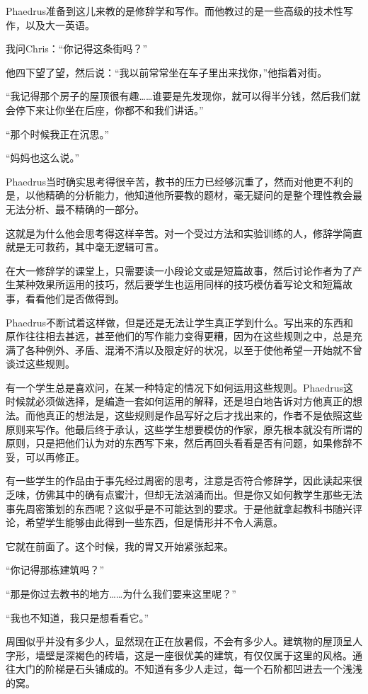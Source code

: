 \documentclass[UTF8]{article}
\begin{document}
\par Phaedrus准备到这儿来教的是修辞学和写作。而他教过的是一些高级的技术性写作，以及大一英语。
\par 我问Chris：“你记得这条街吗？”
\par 他四下望了望，然后说：“我以前常常坐在车子里出来找你，”他指着对街。
\par “我记得那个房子的屋顶很有趣……谁要是先发现你，就可以得半分钱，然后我们就会停下来让你坐在后座，你都不和我们讲话。”
\par “那个时候我正在沉思。”
\par “妈妈也这么说。”
\par Phaedrus当时确实思考得很辛苦，教书的压力已经够沉重了，然而对他更不利的是，以他精确的分析能力，他知道他所要教的题材，毫无疑问的是整个理性教会最无法分析、最不精确的一部分。
\par 这就是为什么他会思考得这样辛苦。对一个受过方法和实验训练的人，修辞学简直就是无可救药，其中毫无逻辑可言。
\par 在大一修辞学的课堂上，只需要读一小段论文或是短篇故事，然后讨论作者为了产生某种效果所运用的技巧，然后要学生也运用同样的技巧模仿着写论文和短篇故事，看看他们是否做得到。
\par Phaedrus不断试着这样做，但是还是无法让学生真正学到什么。写出来的东西和原作往往相去甚远，甚至他们的写作能力变得更糟，因为在这些规则之中，总是充满了各种例外、矛盾、混淆不清以及限定好的状况，以至于使他希望一开始就不曾谈过这些规则。
\par 有一个学生总是喜欢问，在某一种特定的情况下如何运用这些规则。Phaedrus这时候就必须做选择，是编造一套如何运用的解释，还是坦白地告诉对方他真正的想法。而他真正的想法是，这些规则是作品写好之后才找出来的，作者不是依照这些原则来写作。他最后终于承认，这些学生想要模仿的作家，原先根本就没有所谓的原则，只是把他们认为对的东西写下来，然后再回头看看是否有问题，如果修辞不妥，可以再修正。
\par 有一些学生的作品由于事先经过周密的思考，注意是否符合修辞学，因此读起来很乏味，仿佛其中的确有点蜜汁，但却无法汹涌而出。但是你又如何教学生那些无法事先周密策划的东西呢？这似乎是不可能达到的要求。于是他就拿起教科书随兴评论，希望学生能够由此得到一些东西，但是情形并不令人满意。
\par 它就在前面了。这个时候，我的胃又开始紧张起来。
\par “你记得那栋建筑吗？”
\par “那是你过去教书的地方……为什么我们要来这里呢？”
\par “我也不知道，我只是想看看它。”
\par 周围似乎并没有多少人，显然现在正在放暑假，不会有多少人。建筑物的屋顶呈人字形，墙壁是深褐色的砖墙，这是一座很优美的建筑，有仅仅属于这里的风格。通往大门的阶梯是石头铺成的。不知道有多少人走过，每一个石阶都凹进去一个浅浅的窝。
\end{document}
